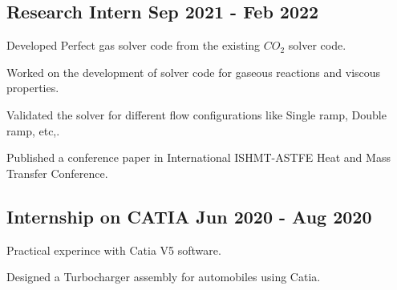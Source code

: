 \subsection{{Research Intern \hfill  Sep 2021 - Feb 2022}}
\begin{zitemize}
\item {Developed Perfect gas solver code from the existing $CO_2$ solver code.}
\item {Worked on the development of solver code for gaseous reactions and viscous properties.}
\item {Validated the solver for different flow configurations like Single ramp, Double ramp, etc,.}
\item {Published a conference paper in International ISHMT-ASTFE Heat and Mass Transfer Conference.}
\end{zitemize}

\subsection{{Internship on CATIA \hfill Jun 2020 - Aug 2020}}
\begin{zitemize}
\item {Practical experince with Catia V5 software.}
\item {Designed a Turbocharger assembly for automobiles using Catia.}
\end{zitemize}


